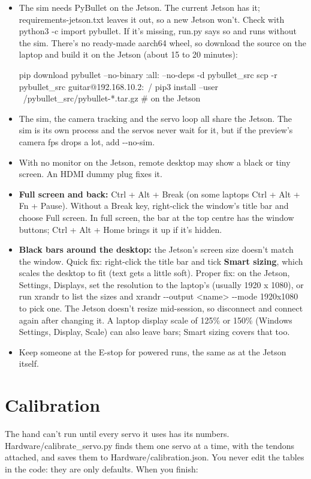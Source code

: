 \documentclass[11pt,letterpaper]{article}
\newcommand{\code}[1]{\textcolor{codeblue}{\ttfamily\smaller\relax #1}}
\begin{document}
\begin{itemize}
  \item The sim needs PyBullet on the Jetson. The current Jetson has it; \code{requirements-{}\allowbreak{}jetson.\allowbreak{}txt} leaves it out, so a new Jetson won't. Check with \code{python3 -{}c \textquotedbl{}import pybullet\textquotedbl{}}. If it's missing, \code{run.py} says so and runs without the sim. There's no ready-made aarch64 wheel, so download the source on the laptop and build it on the Jetson (about 15 to 20 minutes):
\begin{codeblock}
pip download pybullet --no-binary :all: --no-deps -d pybullet_src
scp -r pybullet_src guitar@192.168.10.2:~/
pip3 install --user ~/pybullet_src/pybullet-*.tar.gz      # on the Jetson
\end{codeblock}
  \item The sim, the camera tracking and the servo loop all share the Jetson. The sim is its own process and the servos never wait for it, but if the preview's camera fps drops a lot, add \code{-{}-{}no-{}\allowbreak{}sim}.
  \item With no monitor on the Jetson, remote desktop may show a black or tiny screen. An HDMI dummy plug fixes it.
  \item \textbf{Full screen and back:} Ctrl + Alt + Break (on some laptops Ctrl + Alt + Fn + Pause). Without a Break key, right-click the window's title bar and choose Full screen. In full screen, the bar at the top centre has the window buttons; Ctrl + Alt + Home brings it up if it's hidden.
  \item \textbf{Black bars around the desktop:} the Jetson's screen size doesn't match the window. Quick fix: right-click the title bar and tick \textbf{Smart sizing}, which scales the desktop to fit (text gets a little soft). Proper fix: on the Jetson, Settings, Displays, set the resolution to the laptop's (usually 1920 x 1080), or run \code{xrandr} to list the sizes and \code{xrandr -{}-{}output <name> -{}-{}mode 1920x1080} to pick one. The Jetson doesn't resize mid-session, so disconnect and connect again after changing it. A laptop display scale of 125\% or 150\% (Windows Settings, Display, Scale) can also leave bars; Smart sizing covers that too.
  \item Keep someone at the E-stop for powered runs, the same as at the Jetson itself.
\end{itemize}


\section{Calibration}
The hand can't run until every servo it uses has its numbers. \code{Hardware/\allowbreak{}calibrate\_\allowbreak{}servo.py} finds them one servo at a time, with the tendons attached, and saves them to \code{Hardware/\allowbreak{}calibration.json}. You never edit the tables in the code: they are only defaults. When you finish:
\end{document}

